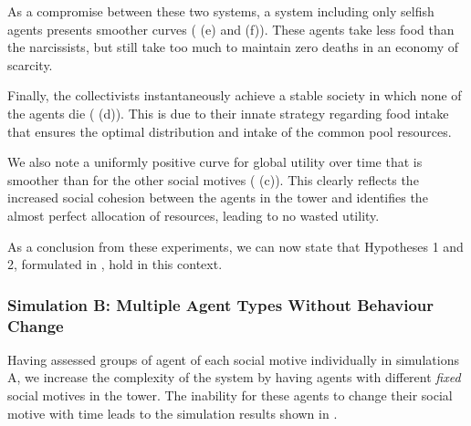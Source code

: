 As a compromise between these two systems, a system including only selfish agents presents smoother curves ( (e) and (f)). These agents take less food than the narcissists, but still take too much to maintain zero deaths in an economy of scarcity.

Finally, the collectivists instantaneously achieve a stable society in which none of the agents die ( (d)). This is due to their innate strategy regarding food intake that ensures the optimal distribution and intake of the common pool resources.

We also note a uniformly positive curve for global utility over time that is smoother than for the other social motives ( (c)). This clearly reflects the increased social cohesion between the agents in the tower and identifies the almost perfect allocation of resources, leading to no wasted utility.

As a conclusion from these experiments, we can now state that Hypotheses 1 and 2, formulated in , hold in this context.

\subsubsection{Simulation B: Multiple Agent Types Without Behaviour Change}

Having assessed groups of agent of each social motive individually in simulations A, we increase the complexity of the system by having agents with different \textit{fixed} social motives in the tower. The inability for these agents to change their social motive with time leads to the simulation results shown in .

